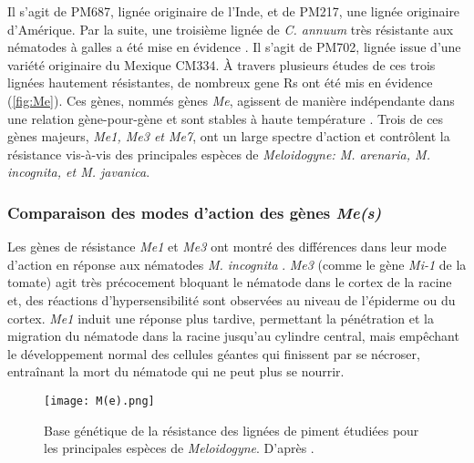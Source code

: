 	 Il s’agit de PM687, lignée  originaire de l’Inde, et de PM217, une lignée  originaire d’Amérique. Par la suite, une troisième lignée de \textit{C. annuum} très résistante aux nématodes à galles a été
mise en évidence \citep{Djian-Caporalino1999}. Il s’agit de PM702, lignée issue d’une
variété  originaire du Mexique \gls{CM334}.
À travers plusieurs   études de ces trois lignées hautement résistantes,  de nombreux  \glspl{gene R} ont été mis en évidence  (\autoref{fig:Me}).
Ces gènes, nommés gènes\textit{ Me}, agissent de manière indépendante dans une relation \og gène-pour-gène  \fg{} et sont stables à haute température \citep{Dalmasso1985, Djian-Caporalino1999, Djian-Caporalino2001, Djian-Caporalino2007}. 
Trois de ces gènes majeurs,  \textit{Me1, Me3 et Me7},  ont un large spectre d’action et contrôlent la résistance vis-à-vis des principales espèces de \textit{ Meloidogyne: M. arenaria, M. incognita, et M. javanica}.


\subsubsection{Comparaison des modes d'action des gènes \textit{ Me(s)}} 
\label{sec:compR-gene-piment}
	Les gènes de résistance \textit{Me1} et \textit{Me3 } ont montré des différences dans leur mode d'action en réponse aux nématodes  \textit{M. incognita} \citep{Blevezacheo1998, Pegard2005}. \textit{Me3 } (comme le gène \textit{Mi-1} de la tomate) agit très précocement bloquant
le nématode dans le cortex de la racine et, des réactions d'hypersensibilité sont observées au niveau
de l’épiderme ou du cortex. \textit{Me1}
induit une réponse plus tardive, permettant la pénétration et la migration du nématode dans la racine
jusqu’au cylindre central, mais empêchant le développement normal des cellules géantes qui finissent par se nécroser, entraînant la mort du nématode qui ne peut plus se nourrir. 
 
\begin{figure}
	\centering 
	    \texttt{[image: M(e).png]}
		\caption[ Base génétique de la résistance des lignées de piment étudiées
		     pour les principales  espèces de \textit{ Meloidogyne}.]{ Base génétique de la résistance des lignées de 
		     piment étudiées pour les principales 
		     espèces de \textit{ Meloidogyne}. D'après \citet{Djian-Caporalino2015}.
		}
		\label{fig:Me}
\end{figure}

